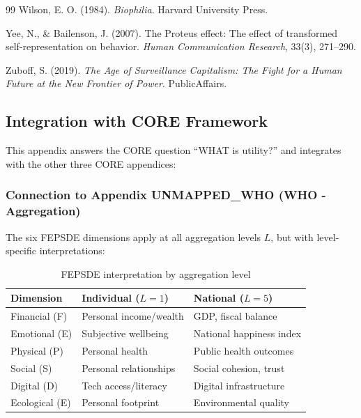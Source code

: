 \begin{thebibliography}{99}
Wilson, E. O. (1984).
\textit{Biophilia}.
Harvard University Press.

Yee, N., \& Bailenson, J. (2007).
The Proteus effect: The effect of transformed self-representation on behavior.
\textit{Human Communication Research}, 33(3), 271--290.

Zuboff, S. (2019).
\textit{The Age of Surveillance Capitalism: The Fight for a Human Future at the New Frontier of Power}.
PublicAffairs.

\end{thebibliography}




\subsection{Integration with CORE Framework}
\label{sec:C-core-integration}

This appendix answers the CORE question ``WHAT is utility?'' and integrates 
with the other three CORE appendices:

\subsubsection{Connection to Appendix UNMAPPED_WHO (WHO - Aggregation)}

The six FEPSDE dimensions apply at all aggregation levels $L$, but with 
level-specific interpretations:

\begin{table}[h]
\centering
\small
\begin{tabular}{l|ll}
\toprule
\textbf{Dimension} & \textbf{Individual ($L=1$)} & \textbf{National ($L=5$)} \\
\midrule
Financial (F) & Personal income/wealth & GDP, fiscal balance \\
Emotional (E) & Subjective wellbeing & National happiness index \\
Physical (P) & Personal health & Public health outcomes \\
Social (S) & Personal relationships & Social cohesion, trust \\
Digital (D) & Tech access/literacy & Digital infrastructure \\
Ecological (E) & Personal footprint & Environmental quality \\
\bottomrule
\end{tabular}
\caption{FEPSDE interpretation by aggregation level}
\end{table}


